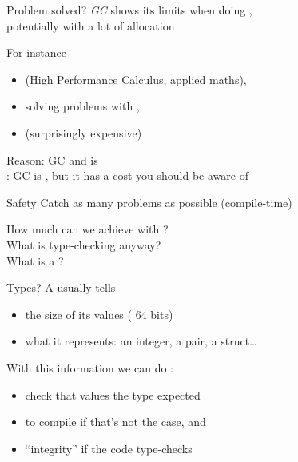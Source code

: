 \documentclass[10pt]{beamer}
\begin{document}
\begin{frame}{Problem solved?}
  \emph{GC} shows its limits when doing ,\\
  potentially with a lot of allocation
  \bigskip

  For instance
  \smallskip
  \begin{itemize}\bigsep
    \item {} \hfill (High Performance Calculus, applied maths),
    \item solving problems with ,
    \item {} \hfill (surprisingly expensive)
  \end{itemize}
  \bigskip

  Reason: GC  and is  \\
  : GC is , but it has a cost you should be aware of
\end{frame}






\begin{frame}{Safety}
  Catch as many problems as possible  (compile-time)
  \bigskip
  \begin{center}
    How much can we achieve with ?\\
    What is type-checking anyway?\\
    What is a ?
  \end{center}
\end{frame}





\begin{frame}{Types?}
  A  usually tells
  \begin{itemize}
    \item the size of its values ( $64$ bits)
    \item what it represents: an integer, a pair, a struct\ldots
  \end{itemize}
  \bigskip
  \pause
  With this information we can do :
  \begin{itemize}
    \item check that values  the type expected
    \item {} to compile if that's not the case, and
    \item {} ``integrity'' if the code type-checks
  \end{itemize}
\end{frame}
\end{document}
